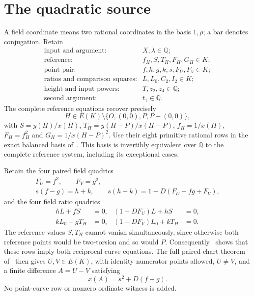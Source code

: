 \documentclass[11pt,a4paper]{article}
\theoremstyle{remark}\newtheorem{remark}[theorem]{Remark}
\newcommand{\Q}{\mathbb Q}\newcommand{\Z}{\mathbb Z}
\begin{document}
\section{The quadratic source}
A field coordinate means two rational coordinates in the basis
$1,\rho$; a bar denotes conjugation. Retain
\[
\begin{array}{ll}
 \text{input and argument:}&X,\lambda\in\Q;\\
 \text{reference:}&f_H,S,T_H,F_H,G_H\in K;\\
 \text{point pair:}&f,h,g,k,s,F_U,F_V\in K;\\
 \text{ratios and comparison squares:}&L,L_0,C_2,I_2\in K;\\
 \text{height and input powers:}&T,z_2,z_4\in\Q;\\
 \text{second argument:}&t_1\in\Q.
\end{array}
\]
The complete reference equations recover precisely
\[
 H\in E(K)\setminus\{O,(0,0),P,P+(0,0)\},
\]
with $S=y(H)/x(H)$, $T_H=y(H-P)/x(H-P)$,
$f_H=1/x(H)$, $F_H=f_H^2$ and $G_H=1/x(H-P)^2$.
Use their eight primitive rational rows in the exact balanced basis
of~\cite{Basis}. This basis is invertibly equivalent over $\Q$ to
the complete reference system, including its exceptional cases.

Retain the four paired field quadrics
\begin{equation}\label{eq:pair}
 \begin{gathered}
 F_U=f^2,\qquad F_V=g^2,\\
 s(f-g)=h+k,\qquad
 s(h-k)=1-D(F_U+fg+F_V),
 \end{gathered}
\end{equation}
and the four field ratio quadrics
\begin{equation}\label{eq:ratios}
 \begin{aligned}
 hL+fS&=0,&(1-DF_U)L+hS&=0,\\
 kL_0+gT_H&=0,&(1-DF_V)L_0+kT_H&=0.
 \end{aligned}
\end{equation}
The reference values $S,T_H$ cannot vanish simultaneously, since
otherwise both reference points would be two-torsion and so would $P$.
Consequently~\cite[Theorem 1.1]{Pair} shows that these rows imply
both reciprocal curve equations. The full paired-chart theorem
of~\cite{Trace} then gives $U,V\in E(K)$, with identity numerator
points allowed, $U\ne V$, and a finite difference $A=U-V$ satisfying
\[
                         x(A)=s^2+D(f+g).
\]
No point-curve row or nonzero ordinate witness is added.
\end{document}

